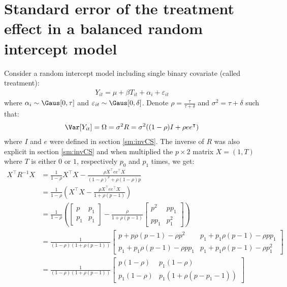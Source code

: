 \documentclass[12pt]{article}
\newcommand\trans[1]{{#1}^\intercal}%
\begin{document}
\section{Standard error of the treatment effect \newline in a balanced random intercept model}
\label{sm:seRI}
Consider a random intercept model including single binary covariate
(called treatment):
\begin{align*}
Y_{it} = \mu + \beta T_{it} + \alpha_i + \varepsilon_{it}
\end{align*}
where \(\alpha_i \sim \Gaus[0,\tau]\) and \(\varepsilon_{it} \sim
\Gaus[0,\delta]\). Denote \(\rho = \frac{\tau}{\tau+\delta}\) and
\(\sigma^2=\tau+\delta\) such that:
\begin{align*}
\Var[Y_{it}] = \Omega = \sigma^2 R = \sigma^2 ((1-\rho) I + \rho e\trans{e})
\end{align*}
where \(I\) and \(e\) were defined in section \ref{sm:invCS}. The inverse
of \(R\) was also explicit in section \ref{sm:invCS} and when multiplied
the \(p \times 2\) matrix \(X=(1,T)\) where \(T\) is either \(0\) or
\(1\), respectively \(p_0\) and \(p_1\) times, we get:
\begin{align*}
\trans{X} R^{-1} X &= \frac{1}{1-\rho} \trans{X}X - \frac{\rho\trans{X} e\trans{e} X}{(1-\rho)^2+\rho(1-\rho)p}  \\
&= \frac{1}{1-\rho} \left(\trans{X}X - \frac{\rho\trans{X} e\trans{e} X}{1 + \rho (p-1)}\right)  \\
&= \frac{1}{1-\rho} \left(\begin{bmatrix} p & p_1 \\ p_1 & p_1 \end{bmatrix} - \frac{\rho}{1+\rho(p-1)}  \begin{bmatrix} p^2 & p p_1 \\ p p_1 & p^2_1 \end{bmatrix}\right) \\
&= \frac{1}{(1-\rho)(1+\rho(p-1))} \begin{bmatrix} p+p\rho(p-1) - \rho p^2
                  & p_1+p_1\rho(p-1)- \rho p p_1
                  \\ p_1+p_1\rho(p-1)- \rho p p_1
                  & p_1+p_1\rho(p-1)- \rho p_1^2
\end{bmatrix}   \\
&= \frac{1}{(1-\rho)(1+\rho(p-1))} \begin{bmatrix} p(1-\rho)
                  & p_1(1-\rho)
                  \\ p_1(1-\rho)
                  & p_1(1+\rho (p-p_1-1))
\end{bmatrix}   
\end{align*}
\end{document}
